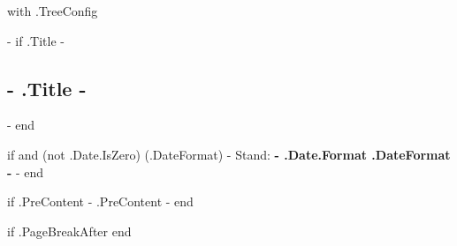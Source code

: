 {{ with .TreeConfig }}

    {{- if .Title -}}
    \subsection{ {{- .Title -}} }
    {{- end }}

    {{ if and (not .Date.IsZero) (.DateFormat) -}}
    Stand: \textbf{ {{- .Date.Format .DateFormat -}} }
    {{- end }}


    {{ if .PreContent -}}
    {{ .PreContent }}
    {{- end }}


    {{ if .PageBreakAfter }}
        \vfill
    {{ end }}

